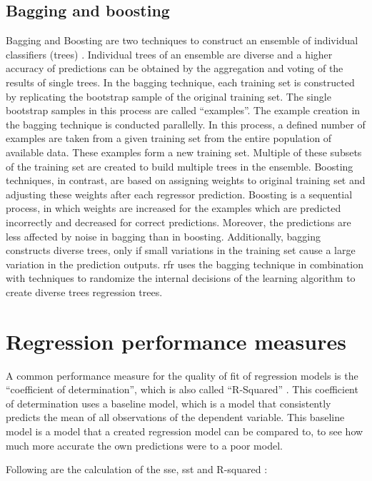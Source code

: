 \documentclass[a4paper, 11pt, oneside]{Thesis}  %
\begin{document}
\subsection{Bagging and boosting}

Bagging and Boosting are two techniques to construct an ensemble of individual classifiers (trees) \cite{Dietterich.2000}. Individual trees of an ensemble are diverse and a higher accuracy of predictions can be obtained by the aggregation and voting of the results of single trees. In the bagging technique, each training set is constructed by replicating the bootstrap sample of the original training set. The single bootstrap samples in this process are called “examples”. The example creation in the bagging technique is conducted parallelly. In this process, a defined number of examples are taken from a given training set from the entire population of available data. These examples form a new training set. Multiple of these subsets of the training set are created to build multiple trees in the ensemble. Boosting techniques, in contrast, are based on assigning weights to original training set and adjusting these weights after each regressor prediction. Boosting is a sequential process, in which weights are increased for the examples which are predicted incorrectly and decreased for correct predictions. Moreover, the predictions are less affected by noise in bagging than in boosting. Additionally, bagging constructs diverse trees, only if small variations in the training set cause a large variation in the prediction outputs. \ac{rfr} uses the bagging technique in combination with techniques to randomize the internal decisions of the learning algorithm to create diverse trees regression trees.


\section{Regression performance measures}

A common performance measure for the quality of fit of regression models is the ``coefficient of determination'', which is also called ``R-Squared'' \cite{Devasthali.2018}. This coefficient of determination uses a baseline model, which is a model that consistently predicts the mean of all observations of the dependent variable. This baseline model is a model that a created regression model can be compared to, to see how much more accurate the own predictions were to a poor model.

Following are the calculation of the \ac{sse}, \ac{sst} and R-squared \cite{Devasthali.2018}:
\end{document}
